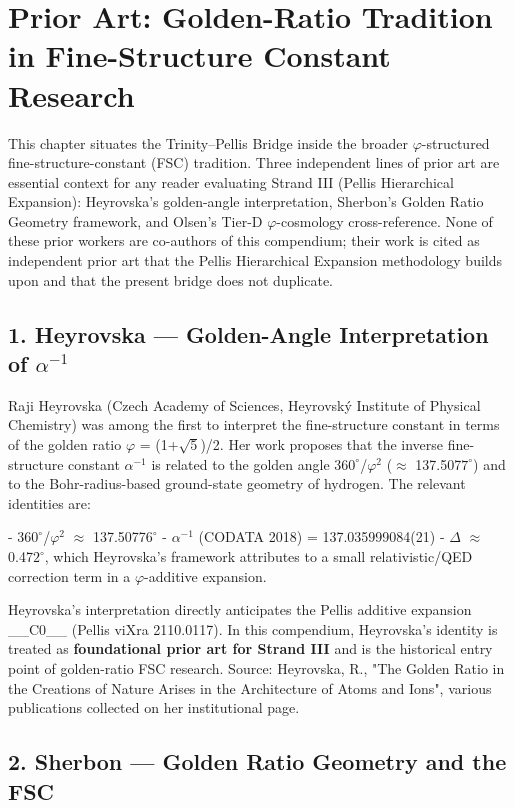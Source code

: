 
\section{Prior Art: Golden-Ratio Tradition in Fine-Structure Constant Research}

This chapter situates the Trinity--Pellis Bridge inside the broader $\varphi$-structured fine-structure-constant (FSC) tradition. Three independent lines of prior art are essential context for any reader evaluating Strand III (Pellis Hierarchical Expansion): Heyrovska's golden-angle interpretation, Sherbon's Golden Ratio Geometry framework, and Olsen's Tier-D $\varphi$-cosmology cross-reference. None of these prior workers are co-authors of this compendium; their work is cited as independent prior art that the Pellis Hierarchical Expansion methodology builds upon and that the present bridge does not duplicate.

\subsection{1. Heyrovska --- Golden-Angle Interpretation of $\alpha^{-1}$}

Raji Heyrovska (Czech Academy of Sciences, Heyrovský Institute of Physical Chemistry) was among the first to interpret the fine-structure constant in terms of the golden ratio $\varphi$ = (1+$\sqrt{5}$)/2. Her work proposes that the inverse fine-structure constant $\alpha^{-1}$ is related to the golden angle 36$0^{\circ}$/$\varphi^{2}$ ($\approx$ 137.507$7^{\circ}$) and to the Bohr-radius-based ground-state geometry of hydrogen. The relevant identities are:

- 36$0^{\circ}$/$\varphi^{2}$ $\approx$ 137.5077$6^{\circ}$
- $\alpha^{-1}$ (CODATA 2018) = 137.035999084(21)
- $\Delta$ $\approx$ 0.47$2^{\circ}$, which Heyrovska's framework attributes to a small relativistic/QED correction term in a $\varphi$-additive expansion.

Heyrovska's interpretation directly anticipates the Pellis additive expansion \_\_C0\_\_ (Pellis viXra 2110.0117). In this compendium, Heyrovska's identity is treated as \textbf{foundational prior art for Strand III} and is the historical entry point of golden-ratio FSC research. Source: Heyrovska, R., "The Golden Ratio in the Creations of Nature Arises in the Architecture of Atoms and Ions", various publications collected on her institutional page.

\subsection{2. Sherbon --- Golden Ratio Geometry and the FSC}

